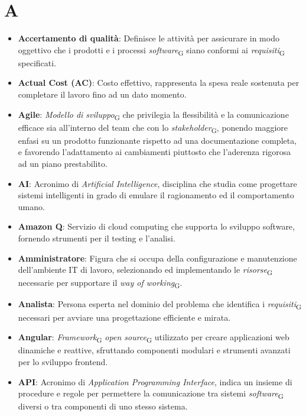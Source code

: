 \section*{A}  
\begin{itemize}
    \item \textbf{Accertamento di qualità}: Definisce le attività per assicurare in modo oggettivo che i prodotti e i processi \textit{software}\textsubscript{G} siano conformi ai \textit{requisiti}\textsubscript{G} specificati.
    \item \textbf{Actual Cost (AC)}: Costo effettivo, rappresenta la spesa reale sostenuta per completare il lavoro fino ad un dato momento.
    \item \textbf{Agile}: \textit{Modello di sviluppo}\textsubscript{G} che privilegia la flessibilità e la comunicazione efficace sia all'interno del team che con lo \textit{stakeholder}\textsubscript{G}, ponendo maggiore enfasi su un prodotto funzionante rispetto ad una documentazione completa, e favorendo l'adattamento ai cambiamenti piuttosto che l'aderenza rigorosa ad un piano prestabilito.
    \item \textbf{AI}: Acronimo di \textit{Artificial Intelligence}, disciplina che studia come progettare sistemi intelligenti in grado di emulare il ragionamento ed il comportamento umano.
     \item \textbf{Amazon Q}: Servizio di cloud computing che supporta lo sviluppo software, fornendo strumenti per il testing e l’analisi.
    \item \textbf{Amministratore}: Figura che si occupa della configurazione e manutenzione dell'ambiente IT di lavoro, selezionando ed implementando le \textit{risorse}\textsubscript{G} necessarie per supportare il \textit{way of working}\textsubscript{G}.
    \item \textbf{Analista}: Persona esperta nel dominio del problema che identifica i \textit{requisiti}\textsubscript{G} necessari per avviare una progettazione efficiente e mirata.
    \item \textbf{Angular}: \textit{Framework}\textsubscript{G} \textit{open source}\textsubscript{G} utilizzato per creare applicazioni web dinamiche e reattive, sfruttando componenti modulari e strumenti avanzati per lo sviluppo frontend.
    \item \textbf{API}: Acronimo di \textit{Application Programming Interface}, indica un insieme di procedure e regole per permettere la comunicazione tra sistemi \textit{software}\textsubscript{G} diversi o tra componenti di uno stesso sistema.

\end{itemize}

